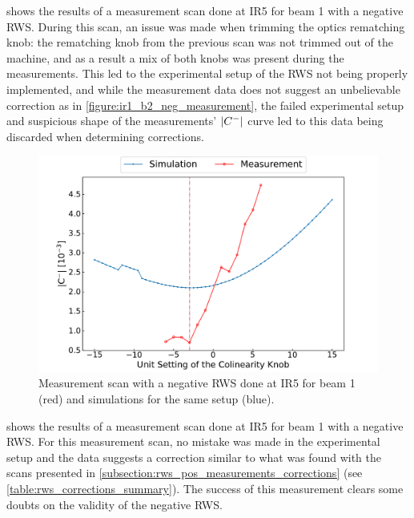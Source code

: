  shows the results of a measurement scan done at IR\num{5} for beam \num{1} with a negative RWS.
During this scan, an issue was made when trimming the optics rematching knob: the rematching knob from the previous scan was not trimmed out of the machine, and as a result a mix of both knobs was present during the measurements.
This led to the experimental setup of the RWS not being properly implemented, and while the measurement data does not suggest an unbelievable correction as in \cref{figure:ir1_b2_neg_measurement}, the failed experimental setup and suspicious shape of the measurements' \(\left\lvert C^{-} \right\rvert\) curve led to this data being discarded when determining corrections.

\begin{figure}[!htb]
    \centering
    \includegraphics*[width=\textwidth]{Figures/Appendices/rws_measurement_ir5_b1_neg.pdf}
    \caption{Measurement scan with a negative RWS done at IR\num{5} for beam \num{1} (\textcolor{mplr}{red}) and simulations for the same setup (\textcolor{mplblue}{blue}).}
    \label{figure:ir5_b1_neg_measurement}
\end{figure}

 shows the results of a measurement scan done at IR\num{5} for beam \num{1} with a negative RWS.
For this measurement scan, no mistake was made in the experimental setup and the data suggests a correction similar to what was found with the scans presented in \cref{subsection:rws_pos_measurements_corrections} (see \cref{table:rws_corrections_summary}).
The success of this measurement clears some doubts on the validity of the negative \gls{RWS}.

